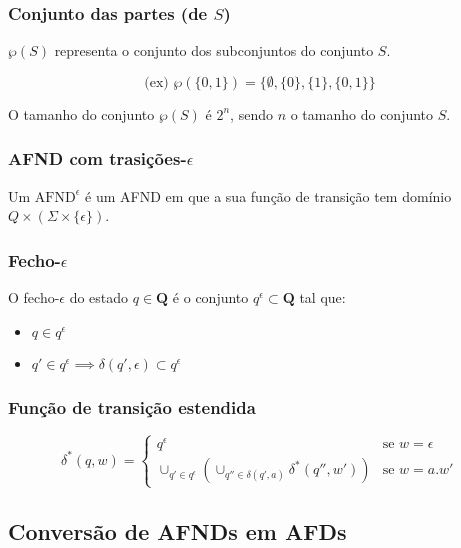 \documentclass{article}
\begin{document}
\subsubsection{Conjunto das partes (de $S$)}

$\wp(S)$ representa o conjunto dos subconjuntos do conjunto $S$.

$$ \text{(ex) } \wp(\{0,1\}) = \{\emptyset, \{0\}, \{1\}, \{0,1\}\} $$

\noindent O tamanho do conjunto $\wp(S)$ é $2^n$, sendo $n$ o tamanho do conjunto $S$.

\subsubsection{AFND com trasições-$\epsilon$}

Um $\text{AFND}^\epsilon$ é um AFND em que a sua função de transição tem domínio $Q \times (\Sigma \times \{\epsilon\})$.

\subsubsection{Fecho-$\epsilon$}

O fecho-$\epsilon$ do estado $q \in \mathbf{Q}$ é o conjunto $q^\epsilon \subset \mathbf{Q}$ tal que:

\begin{itemize}
    \item $q \in q^\epsilon$
    \item $q' \in q^\epsilon \implies \delta(q', \epsilon) \subset q^\epsilon$
\end{itemize}

\subsubsection{Função de transição estendida}

$$ \delta^*(q, w) = \begin{cases}
        q^\epsilon                                                              & \text{se } w = \epsilon \\
        \cup_{q' \in q^\epsilon}(\cup_{q'' \in \delta(q', a)}\delta^*(q'', w')) & \text{se } w = a.w'
    \end{cases} $$

\subsection{Conversão de AFNDs em AFDs}
\end{document}
